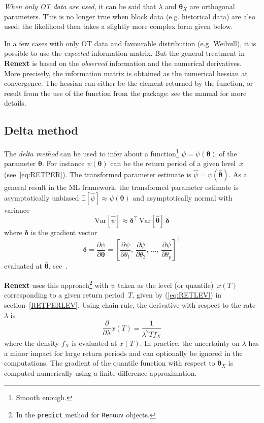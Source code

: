 \documentclass[a4paper]{report}
\newcommand{\pkg}[1]{\textbf{#1}}
\newcommand{\Esp}{\mathbb{E}}
\newcommand{\Var}{\textrm{Var}}
\newcommand{\bs}{\boldsymbol}
\begin{document}
\textit{When only OT data are used}, it can be said that $\lambda$ and
$\bs{\theta}_X$ are orthogonal parameters.  This is no longer true
when block data (e.g. historical data) are also used: the likelihood
then takes a slightly more complex form given below.

In a few cases with only OT data and favourable distribution
(e.g. Weibull), it is possible to use the \textit{expected}
information matrix. But the general treatment in \textbf{Renext} is
based on the \textit{observed} information and the numerical
derivatives. More precisely, the information matrix is obtained as the
%
%
numerical hessian at convergence. The hessian can either be the
element \verb@hessian@ returned by the \verb@optim@ function, or
result from the use of the \verb@hessian@ function from
the \verb@numDeriv@ package: see the manual for more details.


\subsection{Delta method}
The \textit{delta method}
% 
can be used to infer about a  function\footnote{Smooth enough.}
$\psi = \psi(\bs{\theta})$ of the parameter $\bs{\theta}$. For instance 
$\psi(\bs{\theta})$ can be the return period of a given level~$x$
(see~\ref{eq:RETPER}).  The transformed parameter estimate is
$\widehat{\psi} = \psi(\widehat{\bs{\theta}})$.  As a general result
in the ML framework, the transformed parameter estimate is
asymptotically unbiased $ \Esp[\widehat{\psi}] \approx
\psi(\bs{\theta}) $ and asymptotically normal with variance
$$
     \Var[\widehat{\psi}] \approx 
     \bs{\delta}^\top \,\Var[\widehat{\bs{\theta}}]\,\bs{\delta}     
$$
where $\bs{\delta}$ is the gradient vector 
$$
  \bs{\delta} = \frac{\partial \psi}{\partial \bs{\theta}} =  
  \left[\frac{\partial \psi}{\partial \theta_1}, \,
        \frac{\partial \psi}{\partial \theta_2}, \, \dots, \, 
      \frac{\partial \psi}{\partial \theta_p}\right]^\top
$$
evaluated at $\widehat{\bs{\theta}}$, see~\citet[chap. 2]{COLES}. 

\pkg{Renext} uses this approach\footnote{In the \texttt{predict} method for 
\texttt{Renouv} objects.}
with $\psi$ taken as the level (or
quantile)~$x(T)$ corresponding to a given return period~$T$, given by
(\ref{eq:RETLEV}) in section~\ref{RETPERLEV}. Using chain rule, the
derivative with respect to the rate $\lambda$ is
\begin{equation*}
  \frac{\partial}{\partial \lambda} x(T) = \frac{1}{\lambda^2 T f_X}
\end{equation*}
where the density $f_X$ is evaluated at $x(T)$. In practice, the
uncertainty on $\lambda$ has a minor impact for large return periods
and can optionally be ignored in the computations. The
gradient of the quantile function with respect to $\bs{\theta}_X$ is
computed numerically using a finite difference approximation.
\end{document}

